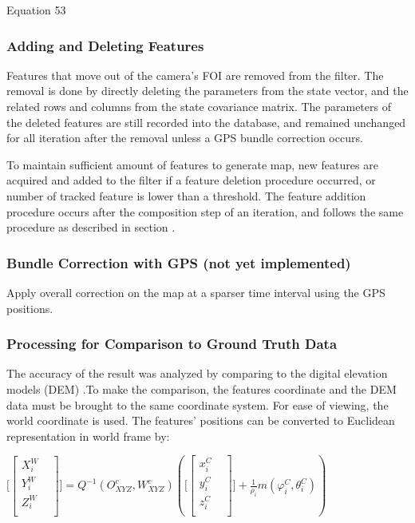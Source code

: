 Equation 53

\subsubsection{Adding and Deleting 
Features}\label{section:_Toc332876136}
Features that move out of the camera's FOI are removed from the filter. 
The removal is done by directly deleting the parameters from the state 
vector, and the related rows and columns from the state covariance 
matrix. The parameters of the deleted features are still recorded into 
the database, and remained unchanged for all iteration after the removal 
unless a GPS bundle correction occurs. 

To maintain sufficient amount of features to generate map, new features 
are acquired and added to the filter if a feature deletion procedure 
occurred, or number of tracked feature is lower than a threshold. The 
feature addition procedure occurs after the composition step of an 
iteration, and follows the same procedure as described in section . 

\subsubsection{Bundle Correction with GPS (not yet 
implemented)}\label{section:_Toc332876138}
Apply overall correction on the map at a sparser time interval using the 
GPS positions. 

\subsubsection{Processing for Comparison to Ground Truth Data}
The accuracy of the result was analyzed by comparing to the digital 
elevation models (DEM) .To make the comparison, the features coordinate 
and the DEM data must be brought to the same coordinate system. For ease 
of viewing, the world coordinate is used. The features' positions can be 
converted to Euclidean representation in world frame by: 

$\lbrack \begin{bmatrix}
X_{i}^{W} & \\
Y_{i}^{W} & \\
Z_{i}^{W} & \\
\end{bmatrix}
\rbrack =Q^{-1}(O_{XYZ}^{c}, W_{XYZ}^{c})(\lbrack \begin{bmatrix}
x_{i}^{C} & \\
y_{i}^{C} & \\
z_{i}^{C} & \\
\end{bmatrix}
\rbrack +\frac{1}{\rho _{i}}m(\varphi _{i}^{C}, \theta _{i}^{C}))$\\


